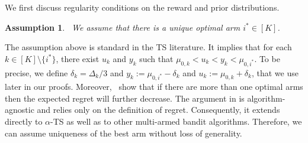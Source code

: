 \documentclass[11pt]{article}
\newtheorem{assumption}{Assumption}[section]
\begin{document}
    
        
        We first discuss regularity conditions on the reward and prior distributions.
%
%
%
%
%
%
%
%
%
%
%
%
%
%
%

        \begin{assumption}~\label{ass:reward}
            We assume that there is a unique optimal arm $i^*\in[K]$. 
        \end{assumption}

        The assumption above is standard in the TS literature. 
        It implies that for each $k\in [K]\setminus \{i^*\}$, there exist $u_k$ and $y_k$ such that $\mu_{0,k} < u_k < y_k < \mu_{0,i^*}$. To be precise, we define $\delta_k=\Delta_k/3$ and $y_k:=\mu_{0,i^*} -\delta_k$ and $u_k:= \mu_{0,k} +\delta_k $, that we use later in our proofs. Moreover,~\cite{agrawal2012analysis} show that if there are more than one optimal arms then the expected regret will further decrease. The argument in \cite[Appendix A]{agrawal2012analysis} is algorithm-agnostic and relies only on the definition of regret. Consequently, it extends directly to $\alpha$-TS as well as to other multi-armed bandit algorithms. Therefore, we can assume uniqueness of the best arm without loss of generality. 
        
\end{document}
